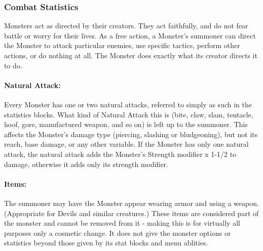 \subsubsection{Combat Statistics}
Monsters act as directed by their creators. They act faithfully, and do not fear battle or worry for their lives.
As a free action, a Monster's summoner can direct the Monster to attack particular enemies, 
use specific tactics, perform other actions, or do nothing at all. 
The Monster does exactly what its creator directs it to do. 

\paragraph{Natural Attack:} Every Monster has one or two natural attacks, referred to simply as such in the statistics blocks.
What kind of Natural Attack this is (bite, claw, slam, tentacle, hoof, gore, manufactured weapon, and so on) is left up to the summoner.
This affects the Monster's damage type (piercing, slashing or bludgeoning), but not its reach, base damage, or any other variable.
If the Monster has only one natural attack, the natural attack adds the Monster's Strength modifier x 1-1/2 to damage, otherwise it adds only
its strength modifier.

\paragraph{Items:} The summoner may have the Monster appear wearing armor and using a weapon. (Appropriate for Devils and similar creatures.)
These items are considered part of the monster and cannot be removed from it - making this is for virtually all purposes only a cosmetic change. 
It does not give the monster options or statistics beyond those given by its stat blocks and menu ablities.

